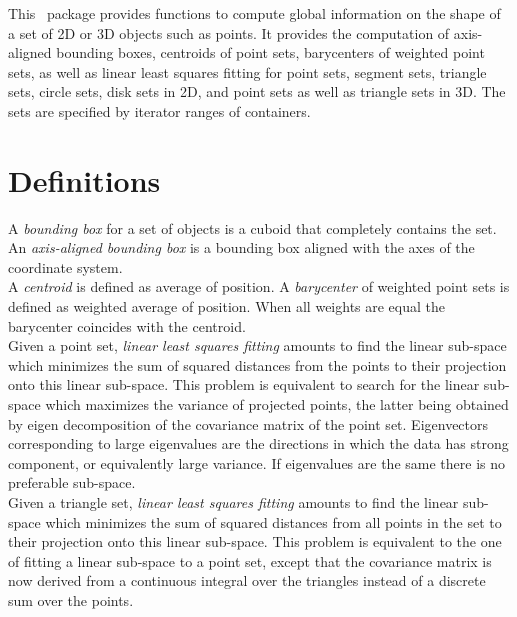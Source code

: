 This \cgal\ package provides functions to compute global information
on the shape of a set of 2D or 3D objects such as points. It provides the computation of axis-aligned bounding boxes, centroids of point sets, barycenters of weighted point sets, as well as linear least squares fitting for point sets, segment sets, triangle sets, circle sets, disk sets in 2D, and point sets as well as triangle sets in 3D. The sets are specified by iterator ranges of containers.\\

\section{Definitions}

A \emph{bounding box} for a set of objects is a cuboid that completely
contains the set. An \emph{axis-aligned bounding box} is a bounding box
aligned with the axes of the coordinate system.\\

A \emph{centroid} is defined as average of position. A \emph{barycenter} of weighted point sets is defined as weighted average of position. When all weights are equal the barycenter coincides with the centroid.\\

Given a point set, \emph{linear least squares fitting} amounts to
find the linear sub-space which minimizes the sum of squared
distances from the points to their projection onto this linear
sub-space. This problem is equivalent to search for the linear
sub-space which maximizes the variance of projected points, the latter
being obtained by eigen decomposition of the covariance
matrix of the point set. Eigenvectors corresponding to large eigenvalues are the
directions in which the data has strong component, or equivalently
large variance. If eigenvalues are the same there is no preferable
sub-space.\\

Given a triangle set, \emph{linear least squares fitting} amounts to find the linear sub-space which minimizes the sum of squared
distances from all points in the set to their projection onto this linear
sub-space. This problem is equivalent to the one of fitting a linear sub-space to a point set, except that the covariance matrix is now derived from a continuous integral over the triangles instead of a discrete sum over the points.


